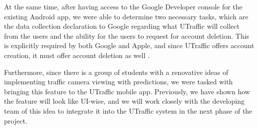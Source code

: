 At the same time, after having access to the Google Developer console for the existing Android app, we were able to determine two necessary tasks, which are the data collection declaration to Google regarding what UTraffic will collect from the users and the ability for the users to request for account deletion. This is explicitly required by both Google and Apple, and since UTraffic offers account creation, it must offer account deletion as well \cite{apple_account_deletion} \cite{google_account_deletion}.

Furthermore, since there is a group of students with a renovative ideas of implementing traffic camera viewing with predictions, we were tasked with bringing this feature to the UTraffic mobile app. Previously, we have shown how the feature will look like UI-wise, and we will work closely with the developing team of this idea to integrate it into the UTraffic system in the next phase of the project.
